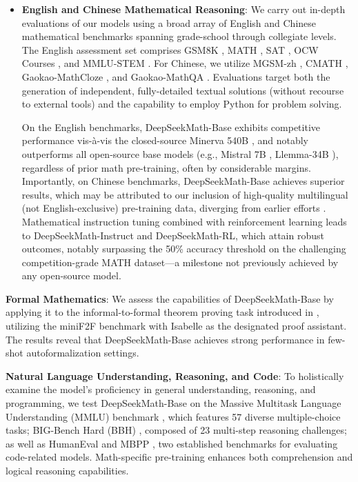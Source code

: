 \begin{itemize}[topsep=0pt]
    \item \textbf{English and Chinese Mathematical Reasoning}: We carry out in-depth evaluations of our models using a broad array of English and Chinese mathematical benchmarks spanning grade-school through collegiate levels. The English assessment set comprises GSM8K \citep{gsm8k}, MATH \citep{MATH}, SAT \citep{llemma}, OCW Courses \citep{minerva}, and MMLU-STEM \citep{mmlu}. For Chinese, we utilize MGSM-zh \citep{mgsm}, CMATH \citep{wei2023cmath}, Gaokao-MathCloze \citep{agieval}, and Gaokao-MathQA \citep{agieval}. Evaluations target both the generation of independent, fully-detailed textual solutions (without recourse to external tools) and the capability to employ Python for problem solving.

    On the English benchmarks, DeepSeekMath-Base exhibits competitive performance vis-à-vis the closed-source Minerva 540B \citep{minerva}, and notably outperforms all open-source base models (e.g., Mistral 7B \citep{mistral}, Llemma-34B \citep{llemma}), regardless of prior math pre-training, often by considerable margins. Importantly, on Chinese benchmarks, DeepSeekMath-Base achieves superior results, which may be attributed to our inclusion of high-quality multilingual (not English-exclusive) pre-training data, diverging from earlier efforts \citep{minerva,llemma}. Mathematical instruction tuning combined with reinforcement learning leads to DeepSeekMath-Instruct and DeepSeekMath-RL, which attain robust outcomes, notably surpassing the 50\% accuracy threshold on the challenging competition-grade MATH dataset—a milestone not previously achieved by any open-source model.
\end{itemize}

\item \textbf{Formal Mathematics}: We assess the capabilities of DeepSeekMath-Base by applying it to the informal-to-formal theorem proving task introduced in \citep{dsp_proof}, utilizing the miniF2F benchmark \citep{minif2f} with Isabelle \citep{isabelle} as the designated proof assistant. The results reveal that DeepSeekMath-Base achieves strong performance in few-shot autoformalization settings.

\item \textbf{Natural Language Understanding, Reasoning, and Code}: To holistically examine the model's proficiency in general understanding, reasoning, and programming, we test DeepSeekMath-Base on the Massive Multitask Language Understanding (MMLU) benchmark \citep{mmlu}, which features 57 diverse multiple-choice tasks; BIG-Bench Hard (BBH) \citep{bbh}, composed of 23 multi-step reasoning challenges; as well as HumanEval \citep{codex} and MBPP \citep{mbpp}, two established benchmarks for evaluating code-related models. Math-specific pre-training enhances both comprehension and logical reasoning capabilities.

